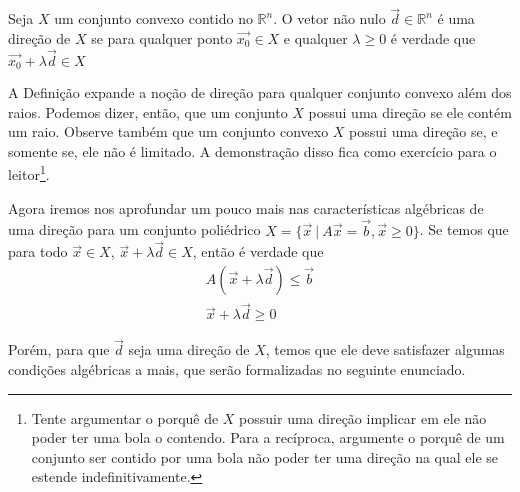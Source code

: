 \begin{def:direção}
	Seja $X$ um conjunto convexo contido no $\mathbb{R}^n$. O vetor não nulo $\vec{d} \in \mathbb{R}^n$ é uma direção de $X$ se para qualquer ponto $\vec{x_0} \in X$ e qualquer $\lambda \geq 0$ é verdade que $\vec{x_0} + \lambda \vec{d} \in X$  
\end{def:direção}

A Definição expande a noção de direção para qualquer conjunto convexo além dos raios. Podemos dizer, então, que um conjunto $X$ possui uma direção se ele contém um raio. Observe também que um conjunto convexo $X$ possui uma direção se, e somente se, ele não é limitado. A demonstração disso fica como exercício para o leitor\footnote{Tente argumentar o porquê de $X$ possuir uma direção implicar em ele não poder ter uma bola o contendo. Para a recíproca, argumente o porquê de um conjunto ser contido por uma bola não poder ter uma direção na qual ele se estende indefinitivamente.}. 

Agora iremos nos aprofundar um pouco mais nas características algébricas de uma direção para um conjunto poliédrico $X = \{\vec{x}\ |\ A\vec{x} = \vec{b}, \vec{x} \geq 0\}$. Se temos que para todo $\vec{x} \in X$, $\vec{x} + \lambda \vec{d} \in X$, então é verdade que
\begin{gather*}
	A (\vec{x} + \lambda \vec{d}) \leq \vec{b} \\
	\vec{x} + \lambda \vec{d} \geq 0
\end{gather*}

Porém, para que $\vec{d}$ seja uma direção de $X$, temos que ele deve satisfazer algumas condições algébricas a mais, que serão formalizadas no seguinte enunciado.

